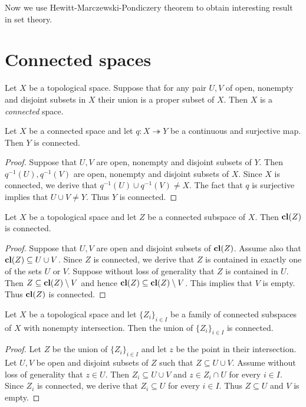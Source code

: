 \noindent
Now we use Hewitt-Marczewski-Pondiczery theorem to obtain interesting result in set theory.


\section{Connected spaces}

\begin{definition}
	Let $X$ be a topological space. Suppose that for any pair $U, V$ of open, nonempty and disjoint subsets in $X$ their union is a proper subset of $X$. Then $X$ is a \textit{connected} space.
\end{definition}

\begin{proposition}\label{proposition:connected_spaces_are_preserved_under_continuous_images}
	Let $X$ be a connected space and let $q:X\twoheadrightarrow Y$ be a continuous and surjective map. Then $Y$ is connected.
\end{proposition}
\begin{proof}
	Suppose that $U,V$ are open, nonempty and disjoint subsets of $Y$. Then $q^{-1}(U),q^{-1}(V)$ are open, nonempty and disjoint subsets of $X$. Since $X$ is connected, we derive that $q^{-1}(U) \cup q^{-1}(V) \neq X$. The fact that $q$ is surjective implies that $U \cup V \neq Y$. Thus $Y$ is connected.
\end{proof}

\begin{fact}\label{fact:connected_subsets_are_preserved_by_closure}
	Let $X$ be a topological space and let $Z$ be a connected subspace of $X$. Then $\mathbf{cl}(Z)$ is connected.
\end{fact}
\begin{proof}
	Suppose that $U, V$ are open and disjoint subsets of $\mathbf{cl}(Z)$. Assume also that $\mathbf{cl}(Z) \subseteq U\cup V$. Since $Z$ is connected, we derive that $Z$ is contained in exactly one of the sets $U$ or $V$. Suppose without loss of generality that $Z$ is contained in $U$. Then $Z \subseteq \mathbf{cl}(Z) \setminus V$ and hence $\mathbf{cl}(Z) \subseteq \mathbf{cl}(Z)\setminus V$. This implies that $V$ is empty. Thus $\mathbf{cl}(Z)$ is connected.
\end{proof}

\begin{fact}\label{fact:union_of_pointed_connected_spaces_is_connected}
	Let $X$ be a topological space and let $\{Z_i\}_{i\in I}$ be a family of connected subspaces of $X$ with nonempty intersection. Then the union of $\{Z_i\}_{i\in I}$ is connected.
\end{fact}
\begin{proof}
	Let $Z$ be the union of $\{Z_i\}_{i\in I}$ and let $z$ be the point in their intersection. Let $U,V$ be open and disjoint subsets of $Z$ such that $Z \subseteq U\cup V$. Assume without loss of generality that $z \in U$. Then $Z_i \subseteq U\cup V$ and $z\in Z_i\cap U$ for every $i\in I$. Since $Z_i$ is connected, we derive that $Z_i\subseteq U$ for every $i \in I$. Thus $Z \subseteq U$ and $V$ is empty.
\end{proof}


